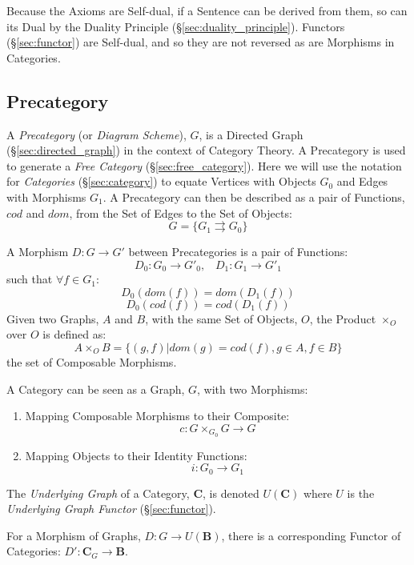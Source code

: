 Because the Axioms are Self-dual, if a Sentence can be derived from
them, so can its Dual by the Duality Principle
(\S\ref{sec:duality_principle}). Functors (\S\ref{sec:functor}) are
Self-dual, and so they are not reversed as are Morphisms in
Categories.



\subsection{Precategory}\label{sec:precategory}

A \emph{Precategory} (or \emph{Diagram Scheme}), $G$, is a Directed
Graph (\S\ref{sec:directed_graph}) in the context of Category
Theory. A Precategory is used to generate a \emph{Free Category}
(\S\ref{sec:free_category}). Here we will use the notation for
\emph{Categories} (\S\ref{sec:category}) to equate Vertices with
Objects $G_0$ and Edges with Morphisms $G_1$. A Precategory can then
be described as a pair of Functions, $cod$ and $dom$, from the Set of
Edges to the Set of Objects:
\[
    G = \{G_1 \rightrightarrows G_0\}
\]

A Morphism $D : G \rightarrow G'$ between Precategories is a pair of
Functions:
\[
    D_0 : G_0 \rightarrow G'_0, \;\;\; D_1 : G_1 \rightarrow G'_1
\]
such that $\forall f \in G_1$:
\[
    D_0(dom(f)) = dom(D_1(f))
\]\[
    D_0(cod(f)) = cod(D_1(f))
\]
Given two Graphs, $A$ and $B$, with the same Set of Objects, $O$, the
Product $\times_O$ over $O$ is defined as:
\[
    A \times_O B = \{ (g,f) | dom(g) = cod(f), g \in A, f \in B \}
\]
the set of Composable Morphisms.

A Category can be seen as a Graph, $G$, with two Morphisms:
\begin{enumerate}
    \item Mapping Composable Morphisms to their Composite:
        \[c : G \times_{G_0} G \rightarrow G\]
    \item Mapping Objects to their Identity Functions:
        \[i: G_0 \rightarrow G_1\]
\end{enumerate}
The \emph{Underlying Graph} of a Category, $\mathbf{C}$, is denoted
$U(\mathbf{C})$ where $U$ is the \emph{Underlying Graph Functor}
(\S\ref{sec:functor}).

For a Morphism of Graphs, $D : G \rightarrow U(\mathbf{B})$, there is
a corresponding Functor of Categories: $D' : \mathbf{C}_G \rightarrow
\mathbf{B}$.

